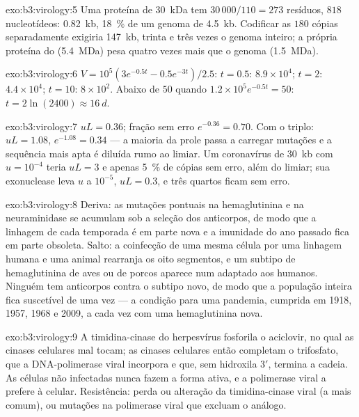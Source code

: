 \begin{solution}{exo:b3:virology:5}
Uma proteína de \qty{30}{kDa} tem $30\,000/110 = 273$ resíduos, $818$
nucleotídeos: \qty{0.82}{kb}, \qty{18}{\%} de um genoma de
\qty{4.5}{kb}. Codificar as $180$ cópias separadamente exigiria
\qty{147}{kb}, trinta e três vezes o genoma inteiro; a própria proteína
do  (\qty{5.4}{MDa}) pesa quatro vezes mais que o genoma
(\qty{1.5}{MDa}).
\end{solution}

\begin{solution}{exo:b3:virology:6}
$V = 10^{5}(3e^{-0.5t} - 0.5e^{-3t})/2.5$: $t = 0.5$: $8.9\times
10^{4}$; $t = 2$: $4.4\times 10^{4}$; $t = 10$: $8\times 10^{2}$. Abaixo
de $50$ quando $1.2\times 10^{5}e^{-0.5t} = 50$: $t = 2\ln(2400) \approx
\qty{16}{d}$.
\end{solution}

\begin{solution}{exo:b3:virology:7}
$uL = 0.36$; fração sem erro $e^{-0.36} = 0.70$. Com o triplo:
$uL =
1.08$, $e^{-1.08} = 0.34$ --- a maioria da prole passa a carregar
mutações e a sequência mais apta é diluída rumo ao limiar. Um
coronavírus de \qty{30}{kb} com $u = 10^{-4}$ teria $uL = 3$ e apenas
\qty{5}{\%} de cópias sem erro, além do limiar; sua exonuclease leva $u$
a $10^{-5}$, $uL = 0.3$, e três quartos ficam sem erro.
\end{solution}

\begin{solution}{exo:b3:virology:8}
Deriva: as mutações pontuais na hemaglutinina e na neuraminidase se
acumulam sob a seleção dos anticorpos, de modo que a linhagem de cada
temporada é em parte nova e a imunidade do ano passado fica em parte
obsoleta. Salto: a coinfecção de uma mesma célula por uma linhagem
humana e uma animal rearranja os oito segmentos, e um subtipo de
hemaglutinina de aves ou de porcos aparece num  adaptado aos
humanos. Ninguém tem anticorpos contra o subtipo novo, de modo que a
população inteira fica suscetível de uma vez --- a condição para uma
pandemia, cumprida em 1918, 1957, 1968 e 2009, a cada vez com uma
hemaglutinina nova.
\end{solution}

\begin{solution}{exo:b3:virology:9}
A timidina-cinase do herpesvírus fosforila o aciclovir, no qual as
cinases celulares mal tocam; as cinases celulares então completam o
trifosfato, que a DNA-polimerase viral incorpora e que, sem hidroxila
3$'$, termina a cadeia. As células não infectadas nunca fazem a forma
ativa, e a polimerase viral a prefere à celular. Resistência: perda ou
alteração da timidina-cinase viral (a mais comum), ou mutações na
polimerase viral que excluam o análogo.
\end{solution}

